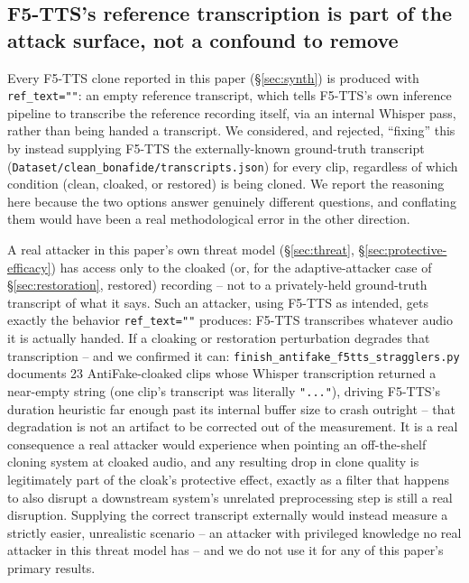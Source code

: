\documentclass[11pt]{article}
\begin{document}
\subsection{F5-TTS's reference transcription is part of the attack surface, not a confound to remove}
\label{sec:ablation-f5tts-transcript}

Every F5-TTS clone reported in this paper (\S\ref{sec:synth}) is
produced with \texttt{ref\_text=""}: an empty reference transcript,
which tells F5-TTS's own inference pipeline to transcribe the
reference recording itself, via an internal Whisper pass, rather than
being handed a transcript. We considered, and rejected, ``fixing''
this by instead supplying F5-TTS the externally-known ground-truth
transcript (\texttt{Dataset/clean\_bonafide/transcripts.json}) for
every clip, regardless of which condition (clean, cloaked, or
restored) is being cloned. We report the reasoning here because the
two options answer genuinely different questions, and conflating them
would have been a real methodological error in the other direction.

A real attacker in this paper's own threat model
(\S\ref{sec:threat}, \S\ref{sec:protective-efficacy}) has access only
to the cloaked (or, for the adaptive-attacker case of
\S\ref{sec:restoration}, restored) recording -- not to a
privately-held ground-truth transcript of what it says. Such an
attacker, using F5-TTS as intended, gets exactly the behavior
\texttt{ref\_text=""} produces: F5-TTS transcribes whatever audio it
is actually handed. If a cloaking or restoration perturbation degrades
that transcription -- and we confirmed it can:
\texttt{finish\_antifake\_f5tts\_stragglers.py} documents 23
AntiFake-cloaked clips whose Whisper transcription returned a
near-empty string (one clip's transcript was literally
\texttt{"..."}), driving F5-TTS's duration heuristic far enough past
its internal buffer size to crash outright -- that degradation is not
an artifact to be corrected out of the measurement. It is a real
consequence a real attacker would experience when pointing an
off-the-shelf cloning system at cloaked audio, and any resulting drop
in clone quality is legitimately part of the cloak's protective
effect, exactly as a filter that happens to also disrupt a
downstream system's unrelated preprocessing step is still a real
disruption. Supplying the correct transcript externally would instead
measure a strictly easier, unrealistic scenario -- an attacker with
privileged knowledge no real attacker in this threat model has -- and
we do not use it for any of this paper's primary results.
\end{document}
